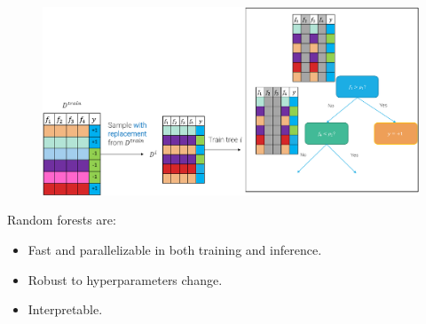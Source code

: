 \begin{description}
\begin{description}
\begin{description}
                        \begin{figure}[H]
                            \raggedleft
                            \includegraphics[width=0.7\linewidth]{./img/_random_forest_random_splitting.pdf}
                        \end{figure}
                \end{description}

                \begin{remark}
                    Random forests are:
                    \begin{itemize}
                        \item Fast and parallelizable in both training and inference.
                        \item Robust to hyperparameters change.
                        \item Interpretable.
                    \end{itemize}
                \end{remark}
        \end{description}
\end{description}